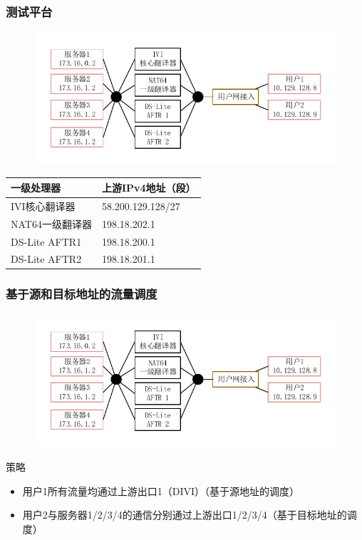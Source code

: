 \documentclass{beamer}
\begin{document}
\begin{frame}
  \frametitle{测试平台}
  \vspace{-1em}
  \begin{figure}
    \includegraphics[width=\textwidth]{figs/12-test-arch.pdf}
  \end{figure}
  \vspace{-2em}

  \begin{table}
    \begin{tabular}{l | l}
      一级处理器 & 上游IPv4地址（段）\\
      \hline
      IVI核心翻译器 & 58.200.129.128/27\\
      NAT64一级翻译器 & 198.18.202.1\\
      DS-Lite AFTR1 & 198.18.200.1\\
      DS-Lite AFTR2 & 198.18.201.1\\
    \end{tabular}
  \end{table}
\end{frame}

\begin{frame}
  \frametitle{基于源和目标地址的流量调度}
  \vspace{-1em}
  \begin{figure}
    \includegraphics[width=\textwidth]{figs/12-test-arch.pdf}
  \end{figure}
  \vspace{-2em}

  \begin{block}{策略}
    \begin{itemize}
    \item 用户1所有流量均通过上游出口1（DIVI）（基于源地址的调度）
    \item 用户2与服务器1/2/3/4的通信分别通过上游出口1/2/3/4（基于目标地址的调度）
    \end{itemize}
  \end{block}
\end{frame}
\end{document}
